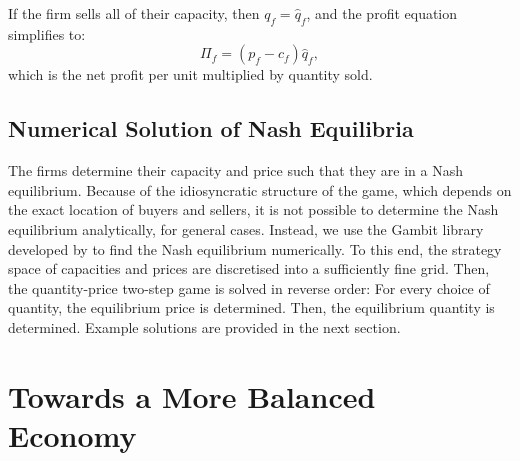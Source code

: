 \documentclass[final,3p,times,authoryear,12pt]{elsarticle}
\begin{document}
If the firm sells all of their capacity, then $q_f = \hat q_f$, and the profit equation simplifies to:
\begin{equation}
    \Pi_f = (p_f- c_f) \hat q_f,
\end{equation}
which is the net profit per unit multiplied by quantity sold.

\subsection{Numerical Solution of Nash Equilibria}

The firms determine their capacity and price such that they are in a Nash equilibrium. 
Because of the idiosyncratic structure of the game, which depends on the exact location of buyers and sellers, 
it is not possible to determine the Nash equilibrium analytically, for general cases. 
Instead, we use the Gambit library developed by  \cite{gambitPython} to find the Nash equilibrium numerically. 
To this end, the strategy space of capacities and prices are discretised into a sufficiently fine grid. 
Then, the quantity-price two-step game is solved in reverse order: 
For every choice of quantity, the equilibrium price is determined.
Then, the equilibrium quantity is determined. 
Example solutions are provided in the next section. 

\section{Towards a More Balanced Economy}
\label{sec:static_game}
\end{document}
